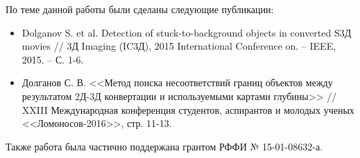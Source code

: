 \documentclass[14pt, a4paper]{extarticle}
\begin{document}
По теме данной работы были сделаны следующие публикации:

\begin{itemize}
	\item Dolganov S. et al. Detection of stuck-to-background objects in converted S3Д movies // 3Д Imaging (IC3Д), 2015 International Conference on. – IEEE, 2015. – С. 1-6.
	\item Долганов С. В. <<Метод поиска несоответствий границ объектов между результатом 2Д-3Д конвертации и используемыми картами глубины>> // XXIII Международная конференция студентов, аспирантов и молодых ученых <<Ломоносов-2016>>, стр. 11-13.
\end{itemize}

Также работа была частично поддержана грантом РФФИ № 15-01-08632-а.

\newpage


\end{document}
